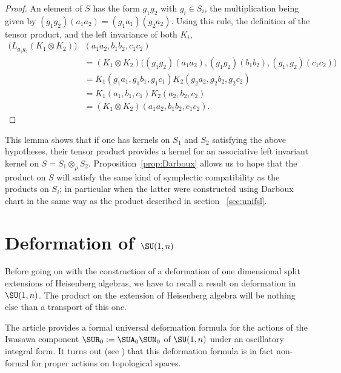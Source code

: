 \begin{proof}
An element of $S$ has the form $g_1g_2$ with $g_i\in S_i$, the multiplication being given by $(g_1g_2)(a_1a_2)=(g_1a_1)(g_2a_2)$. Using this rule, the definition of the tensor product, and the left invariance of both $K_i$,
\[
\begin{split}
\big( L_{g_1g_2}(K_1\otimes K_2) \big)&(a_1a_2,b_1b_2,c_1c_2)\\
            &=(K_1\otimes K_2)\big( (g_1g_2)(a_1a_2),(g_1g_2)(b_1b_2),(g_1,g_2)(c_1c_2) \big)\\
            &=K_1(g_1a_1,g_1b_1,g_1c_1)K_2(g_2a_2,g_2b_2,g_2c_2)\\
            &=K_1(a_1,b_1,c_1)K_2(a_2,b_2,c_2)\\
            &=(K_1\otimes K_2)(a_1a_2,b_1b_2,c_1c_2).
\end{split}
\]

\end{proof}

This lemma shows that if one has kernels on $S_1$ and $S_2$ satisfying the above hypotheses, their tensor product provides a kernel for an associative left invariant kernel on $S=S_1\otimes_{\rho} S_2$.  Proposition~\ref{prop:Darboux} allows us to hope that the product on $S$ will satisfy the same kind of symplectic compatibility as the products on $S_i$; in particular when the latter were constructed using Darboux chart in the same way as the product described in section ~\ref{sec:unifsl}.


\section{Deformation of \texorpdfstring{$\SU(1,n)$}{SU1n}}   \label{SecDefSURme}

Before going on with the construction of a deformation of one dimensional split extensions of Heisenberg algebras, we have to recall a result on deformation in $\SU(1,n)$. The product on the extension of Heisenberg algebra will be nothing else than a transport of this one.

The article \cite{Biel-Massar} provides a formal universal deformation formula for the actions of the Iwasawa component $\SUR_0:=\SUA_0\SUN_0$ of $\SU(1,n)$ under an oscillatory integral form.  It turns out (see \cite{lcBBM}) that this deformation formula is in fact non-formal for proper actions on topological spaces.

